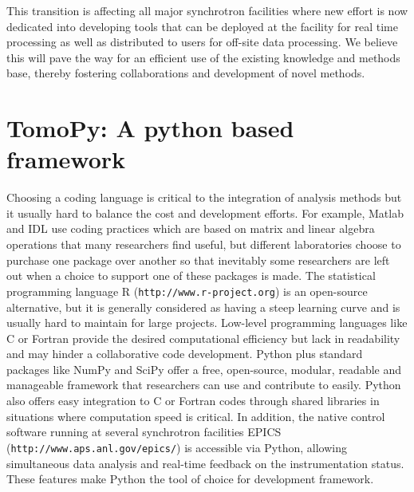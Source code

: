 \documentclass[pdf]{iucr}              %
\begin{document}
This transition is affecting all major synchrotron facilities where new effort is now dedicated into developing tools that can be deployed at the facility for real time processing as well as distributed to users for off-site data processing. We believe this will pave the way for an efficient use of the existing knowledge and methods base, thereby fostering collaborations and development of novel methods.

\section{TomoPy: A python based framework}

Choosing a coding language is critical to the integration of analysis methods but it usually hard to balance the cost and development efforts. For example, Matlab and IDL use coding practices which are based on matrix and linear algebra operations that many researchers find useful, but different laboratories choose to purchase one package over another so that inevitably some researchers are left out when a choice to support one of these packages is made. The statistical programming language R (\texttt{http://www.r-project.org}) is an open-source alternative, but it is generally considered as having a steep learning curve and is usually hard to maintain for large projects. Low-level programming languages like C or Fortran provide the desired computational efficiency but lack in readability and may hinder a collaborative code development. Python plus standard packages like NumPy and SciPy offer a free, open-source, modular, readable and manageable framework that researchers can use and contribute to easily.  Python also offers easy integration to C or Fortran codes through shared libraries in situations where computation speed is critical.  In addition, the native  control software running at several synchrotron facilities EPICS (\texttt{http://www.aps.anl.gov/epics/}) is accessible via Python, allowing simultaneous data analysis and real-time feedback on the instrumentation status. These features make Python the tool of choice for development framework.

\end{document}
